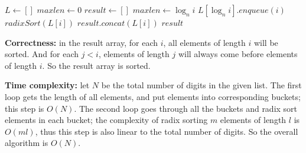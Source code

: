 \documentclass{article}
\begin{document}
\begin{description}
\begin{algorithm}[H]
\begin{algorithmic}[1]
      \State $L \gets []$
      \State $maxlen \gets 0$
      \State $result \gets []$
          \State $maxlen \gets \log_{n}{i}$
        \EndIf
        \State $L[\log_{n}{i}].enqueue(i)$
      \EndFor
        \State $radixSort(L[i])$
        \State $result.concat(L[i])$
      \EndFor
      \State \Return $result$
    \EndFunction

    \end{algorithmic}
  \end{algorithm}

  \textbf{Correctness:} in the result array, for each $i$, all elements of length $i$ will be sorted. And for each $j < i$, elements of length $j$ will always come before elements of length $i$. So the result array is sorted.

  \textbf{Time complexity:} let $N$ be the total number of digits in the given list. The first loop gets the length of all elements, and put elements into corresponding buckets; this step is $O(N)$. The second loop goes through all the buckets and radix sort elements in each bucket; the complexity of radix sorting $m$ elements of length $l$ is $O(ml)$, thus this step is also linear to the total number of digits. So the overall algorithm is $O(N)$.

\end{description}
\end{document}
